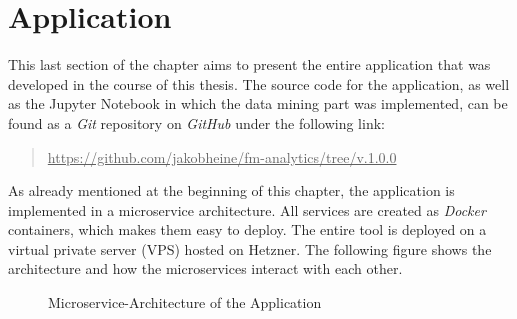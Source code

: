 \clearpage \section{Application}

\label{chap:application}

This last section of the chapter aims to present the entire application that was developed in the course of this thesis. The source code for the application, as well as the Jupyter Notebook in which the data mining part was implemented, can be found as a \emph{Git} repository on \emph{GitHub} under the following link:

\begin{quote}
    \centering
    \underline{https://github.com/jakobheine/fm-analytics/tree/v.1.0.0}
\end{quote}

As already mentioned at the beginning of this chapter, the application is implemented in a microservice architecture. All services are created as \emph{Docker} containers, which makes them easy to deploy. The entire tool is deployed on a virtual private server (VPS) hosted on Hetzner. \parencite[][]{hetzner_about_2021} The following figure shows the architecture and how the microservices interact with each other.

\begin{figure}[H]
    \centering
    \captionsetup{justification=centering}
    \caption{Microservice-Architecture of the Application}
    \label{fig:microservice-architecture}
\end{figure}

